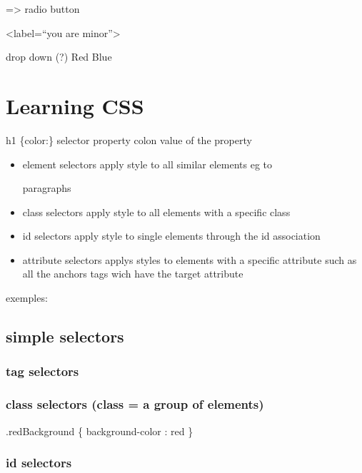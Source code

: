 \documentclass[
]{book}
\begin{document}
=\textgreater{} radio button

\textless label=``you are minor''\textgreater{}

drop down (?)
Red
Blue

\hypertarget{learning-css}{%
\chapter{Learning CSS}\label{learning-css}}

h1 \{color:\}
selector property colon value of the property

\begin{itemize}
\item
  element selectors
  apply style to all similar elements
  eg to

  paragraphs
\item
  class selectors
  apply style to all elements with a specific class
\item
  id selectors
  apply style to single elements through the id association
\item
  attribute selectors
  applys styles to elements with a specific attribute
  such as all the anchors tags wich have the target attribute
\end{itemize}

exemples:

\hypertarget{simple-selectors}{%
\section{simple selectors}\label{simple-selectors}}

\hypertarget{tag-selectors}{%
\subsection{tag selectors}\label{tag-selectors}}

\hypertarget{class-selectors-class-a-group-of-elements}{%
\subsection{class selectors (class = a group of elements)}\label{class-selectors-class-a-group-of-elements}}

.redBackground \{
background-color : red
\}

\hypertarget{id-selectors}{%
\subsection{id selectors}\label{id-selectors}}
\end{document}
